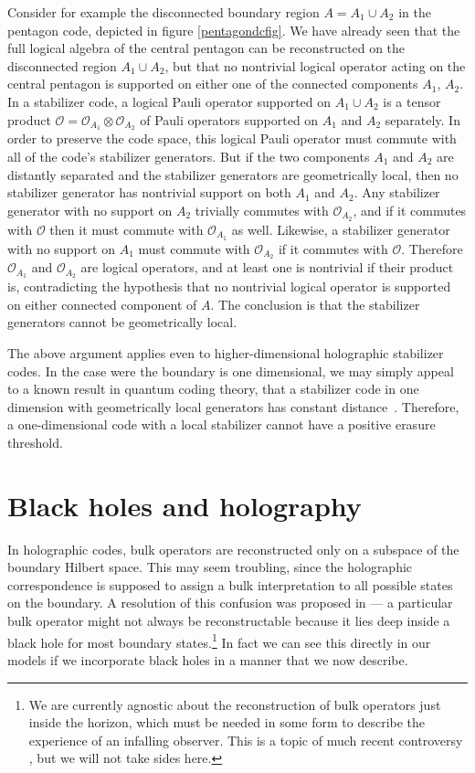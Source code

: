 \documentclass[12pt]{article}
\theoremstyle{plain}
\theoremstyle{plain}
\theoremstyle{plain}
\theoremstyle{plain}
\theoremstyle{result}
\theoremstyle{remark}
\theoremstyle{conjecture}
\theoremstyle{observation}
\theoremstyle{definition}
\theoremstyle{corollary}
\theoremstyle{definition}
\theoremstyle{definition}
\theoremstyle{assumption}
\theoremstyle{definition}
\theoremstyle{problem}
\theoremstyle{fact}
\begin{document}
Consider for example the disconnected boundary region $A=A_1\cup A_2$ in the pentagon code, depicted in figure \ref{pentagondcfig}. We have already seen that the full logical algebra of the central pentagon can be reconstructed on the disconnected region $A_1\cup A_2$, but that no nontrivial logical operator acting on the central pentagon is supported on either one of the connected components $A_1$, $A_2$. In a stabilizer code, a logical Pauli operator supported on $A_1\cup A_2$ is a tensor product $\mathcal{O}=\mathcal{O}_{A_1}\otimes \mathcal{O}_{A_2}$ of Pauli operators supported on $A_1$ and $A_2$ separately. In order to preserve the code space, this logical Pauli operator must commute with all of the code's stabilizer generators. But if the two components $A_1$ and $A_2$ are distantly separated and the stabilizer generators are geometrically local, then no stabilizer generator has nontrivial support on both $A_1$ and $A_2$. Any stabilizer generator with no support on $A_2$ trivially commutes with $\mathcal{O}_{A_2}$, and if it commutes with $\mathcal{O}$ then it must commute with $\mathcal{O}_{A_1}$ as well. Likewise, a stabilizer generator with no support on $A_1$ must commute with $\mathcal{O}_{A_2}$ if it commutes with $\mathcal{O}$. 
Therefore $\mathcal{O}_{A_1}$ and  $\mathcal{O}_{A_2}$ are logical operators, and at least one is nontrivial if their product is, contradicting the hypothesis that no nontrivial logical operator is supported on either connected component of $A$. The conclusion is that the stabilizer generators cannot be geometrically local.

The above argument applies even to higher-dimensional holographic stabilizer codes. In the case were the boundary is one dimensional, we may simply appeal to a known result in quantum coding theory, that a stabilizer code in one dimension with geometrically local generators has constant distance~\cite{Bravyi09, Pastawski15}. 
Therefore, a one-dimensional code with a local stabilizer cannot have a positive erasure threshold.

\section{Black holes and holography}\label{sec:black}
In holographic codes, bulk operators are reconstructed only on a subspace of the boundary Hilbert space.  This may seem troubling, since the holographic correspondence is supposed to assign a bulk interpretation to all possible states on the boundary.  A resolution of this confusion was proposed in \cite{Almheiri14} --- a particular bulk operator might not always be reconstructable because it lies deep inside a black hole for most boundary states.\footnote{We are currently agnostic about the reconstruction of bulk operators just inside the horizon, which must be needed in some form to describe the experience of an infalling observer.  This is a topic of much recent controversy \cite{Almheiri13, Harlow2014}, but we will not take sides here.}  In fact we can see this directly in our models if we incorporate black holes in a manner that we now describe.
\end{document}
